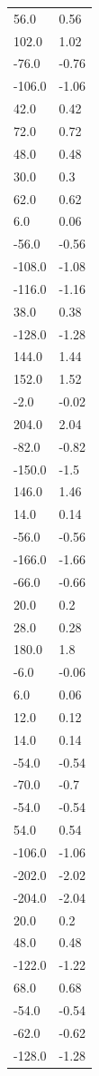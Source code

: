 \begin{longtable}{ll}
56.0 & 0.56 \\
102.0 & 1.02 \\
-76.0 & -0.76 \\
-106.0 & -1.06 \\
42.0 & 0.42 \\
72.0 & 0.72 \\
48.0 & 0.48 \\
30.0 & 0.3 \\
62.0 & 0.62 \\
6.0 & 0.06 \\
-56.0 & -0.56 \\
-108.0 & -1.08 \\
-116.0 & -1.16 \\
38.0 & 0.38 \\
-128.0 & -1.28 \\
144.0 & 1.44 \\
152.0 & 1.52 \\
-2.0 & -0.02 \\
204.0 & 2.04 \\
-82.0 & -0.82 \\
-150.0 & -1.5 \\
146.0 & 1.46 \\
14.0 & 0.14 \\
-56.0 & -0.56 \\
-166.0 & -1.66 \\
-66.0 & -0.66 \\
20.0 & 0.2 \\
28.0 & 0.28 \\
180.0 & 1.8 \\
-6.0 & -0.06 \\
6.0 & 0.06 \\
12.0 & 0.12 \\
14.0 & 0.14 \\
-54.0 & -0.54 \\
-70.0 & -0.7 \\
-54.0 & -0.54 \\
54.0 & 0.54 \\
-106.0 & -1.06 \\
-202.0 & -2.02 \\
-204.0 & -2.04 \\
20.0 & 0.2 \\
48.0 & 0.48 \\
-122.0 & -1.22 \\
68.0 & 0.68 \\
-54.0 & -0.54 \\
-62.0 & -0.62 \\
-128.0 & -1.28 \\

\end{longtable}
